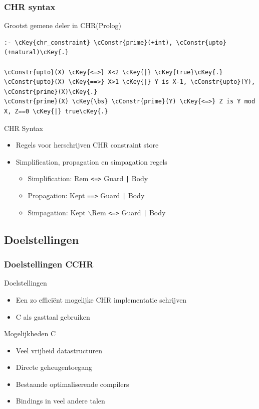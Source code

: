 \documentclass{beamer}
\newcommand{\bs}{$\backslash$}
\newcommand{\cConstr}[1]{\textcolor{blue}{#1}}
\newcommand{\cKey}[1]{\textcolor{red}{#1}}
\newcommand{\code}[1]{{\tt #1}}
\begin{document}
\begin{frame}[containsverbatim]
  \frametitle{CHR syntax}
  \begin{example}{Grootst gemene deler in CHR(Prolog)}
\begin{Verbatim}[commandchars=\\\{\}]
:- \cKey{chr_constraint} \cConstr{prime}(+int), \cConstr{upto}(+natural)\cKey{.}

\cConstr{upto}(X) \cKey{<=>} X<2 \cKey{|} \cKey{true}\cKey{.}
\cConstr{upto}(X) \cKey{==>} X>1 \cKey{|} Y is X-1, \cConstr{upto}(Y), \cConstr{prime}(X)\cKey{.}
\cConstr{prime}(X) \cKey{\bs} \cConstr{prime}(Y) \cKey{<=>} Z is Y mod X, Z==0 \cKey{|} true\cKey{.}
\end{Verbatim}
  \end{example}

  \begin{block}{CHR Syntax}
    \begin{itemize}
      \item Regels voor herschrijven CHR constraint store
      \item Simplification, propagation en simpagation regels \begin{itemize}
        \item Simplification: {Rem} \code{<=>} {Guard} \code{|} {Body}
        \item Propagation: {Kept} \code{==>} {Guard} \code{|} {Body}
        \item Simpagation: {Kept} \bs {Rem} \code{<=>} {Guard} \code{|} {Body}
      \end{itemize}
    \end{itemize}
  \end{block}
\end{frame}

\subsection{Doelstellingen}

\begin{frame}
  \frametitle{Doelstellingen CCHR}
  \begin{block}{Doelstellingen}
    \begin{itemize}
      \item Een zo effici\"ent mogelijke CHR implementatie schrijven
      \item C als gasttaal gebruiken
    \end{itemize}
  \end{block}

  \begin{block}{Mogelijkheden C}
    \begin{itemize}
      \item Veel vrijheid datastructuren
      \item Directe geheugentoegang
      \item Bestaande optimaliserende compilers
      \item Bindings in veel andere talen
    \end{itemize}
  \end{block}

\end{frame}
\end{document}

